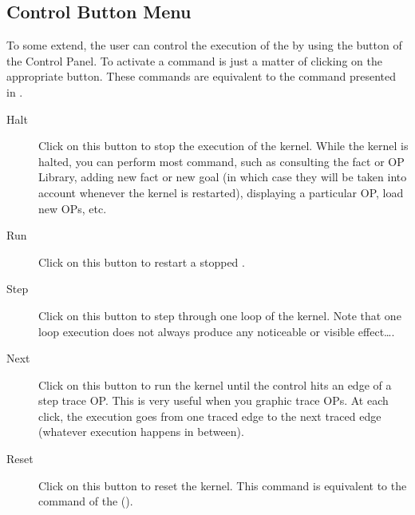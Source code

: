 \subsection{Control Button Menu}

To some extend, the user can control the execution of the \XPK{} by using the
button of the Control Panel. To activate a command is just a matter of clicking
on the appropriate button.  These commands are equivalent to the command
presented in .

\begin{description}

\item[Halt] Click on this button to stop the execution of the \XOPRS{}
kernel. While the kernel is halted, you can perform most command, such as
consulting the fact or OP Library, adding new fact or new goal (in which
case they will be taken into account whenever the kernel is restarted),
displaying a particular OP, load new OPs, etc.

\item[Run] Click on this button to restart a stopped \XPK{}.

\item[Step] Click on this button to step through one loop of the \XOPRS{}
kernel. Note that one loop execution does not always produce any
noticeable or visible effect\dots{}.

\item[Next] Click on this button to run the kernel until the control hits
an edge of a step trace OP. This is very useful when you graphic trace OPs.  At
each click, the execution goes from one traced edge to the next traced edge
(whatever execution happens in between).

\item[Reset] Click on this button to reset the kernel. This command is
equivalent to the  command of the \CPK{}
().

\end{description}


